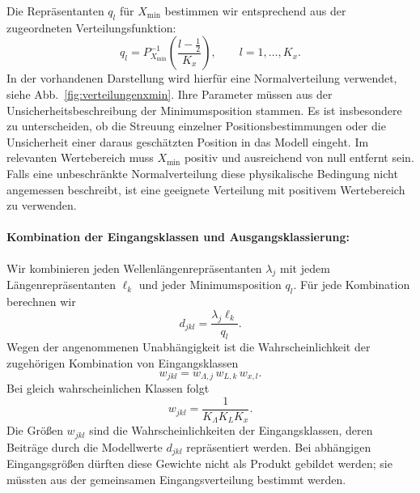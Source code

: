 Die Repräsentanten $q_l$ für $X_{\mathrm{min}}$ bestimmen wir
entsprechend aus der zugeordneten Verteilungsfunktion:
\begin{equation}
q_l=P_{X_{\mathrm{min}}}^{-1}\!\left(
\frac{l-\tfrac12}{K_x}\right),\qquad l=1,\dots,K_x.
\end{equation}
In der vorhandenen Darstellung wird hierfür eine Normalverteilung
verwendet, siehe Abb.~\ref{fig:verteilungenxmin}.
Ihre Parameter müssen aus der Unsicherheitsbeschreibung der
Minimumsposition stammen. Es ist insbesondere zu unterscheiden,
ob die Streuung einzelner Positionsbestimmungen oder die
Unsicherheit einer daraus geschätzten Position in das Modell eingeht.
Im relevanten Wertebereich muss $X_{\mathrm{min}}$ positiv und
ausreichend von null entfernt sein. Falls eine unbeschränkte
Normalverteilung diese physikalische Bedingung nicht angemessen
beschreibt, ist eine geeignete Verteilung mit positivem Wertebereich
zu verwenden.

\paragraph{Kombination der Eingangsklassen und Ausgangsklassierung:}

Wir kombinieren jeden Wellenlängenrepräsentanten $\lambda_j$ mit
jedem Längenrepräsentanten $\ell_k$ und jeder Minimumsposition $q_l$.
Für jede Kombination berechnen wir
\begin{equation}
d_{jkl}=\frac{\lambda_j\ell_k}{q_l}.
\end{equation}
Wegen der angenommenen Unabhängigkeit ist die Wahrscheinlichkeit
der zugehörigen Kombination von Eingangsklassen
\begin{equation}
w_{jkl}=w_{\Lambda,j}\,w_{L,k}\,w_{x,l}.
\end{equation}
Bei gleich wahrscheinlichen Klassen folgt
\begin{equation}
w_{jkl}=\frac{1}{K_\Lambda K_L K_x}.
\end{equation}
Die Größen $w_{jkl}$ sind die Wahrscheinlichkeiten der Eingangsklassen,
deren Beiträge durch die Modellwerte $d_{jkl}$ repräsentiert werden.
Bei abhängigen Eingangsgrößen dürften diese Gewichte nicht als
Produkt gebildet werden; sie müssten aus der gemeinsamen
Eingangsverteilung bestimmt werden.

